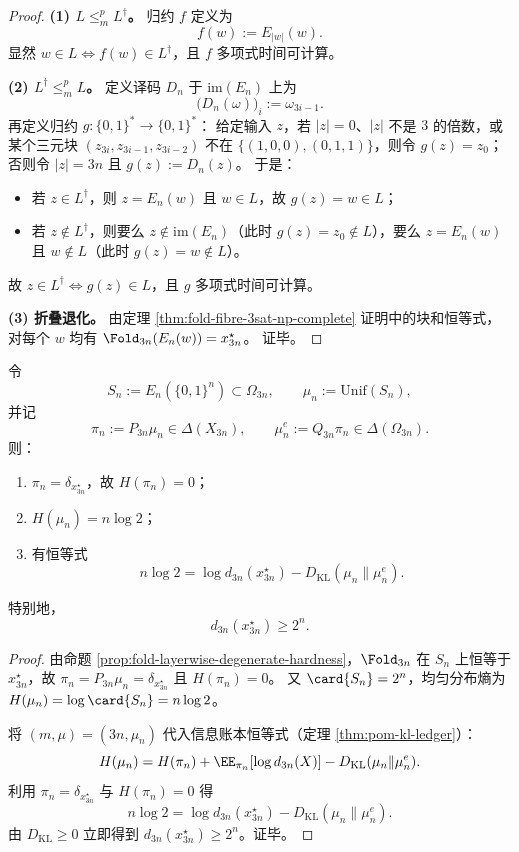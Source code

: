 \begin{proof}
\textbf{(1) \(L\le_m^p L^\dagger\)。}
归约 \(f\) 定义为
\[
f(w):=E_{|w|}(w).
\]
显然 \(w\in L\iff f(w)\in L^\dagger\)，且 \(f\) 多项式时间可计算。
\par
\textbf{(2) \(L^\dagger\le_m^p L\)。}
定义译码 \(D_n\) 于 \(\mathrm{im}(E_n)\) 上为
\[
\bigl(D_n(\omega)\bigr)_i:=\omega_{3i-1}.
\]
再定义归约 \(g:\{0,1\}^\ast\to\{0,1\}^\ast\)：
给定输入 \(z\)，若 \(|z|=0\)、\(|z|\) 不是 \(3\) 的倍数，或某个三元块
\(
(z_{3i},z_{3i-1},z_{3i-2})
\)
不在 \(\{(1,0,0),(0,1,1)\}\)，则令 \(g(z)=z_0\)；
否则令 \(|z|=3n\) 且 \(g(z):=D_n(z)\)。
于是：
\begin{itemize}
  \item 若 \(z\in L^\dagger\)，则 \(z=E_n(w)\) 且 \(w\in L\)，故 \(g(z)=w\in L\)；
  \item 若 \(z\notin L^\dagger\)，则要么 \(z\notin\mathrm{im}(E_n)\)（此时 \(g(z)=z_0\notin L\)），要么 \(z=E_n(w)\) 且 \(w\notin L\)（此时 \(g(z)=w\notin L\)）。
\end{itemize}
故 \(z\in L^\dagger\iff g(z)\in L\)，且 \(g\) 多项式时间可计算。
\par
\textbf{(3) 折叠退化。}
由定理 \ref{thm:fold-fibre-3sat-np-complete} 证明中的块和恒等式，对每个 \(w\) 均有
\(
\Fold_{3n}(E_n(w))=x^\star_{3n}
\)。
证毕。
\end{proof}

\begin{proposition}[宏观熵为零与微观线性熵的账本并存]\label{prop:fold-fiber-ledger-zero-macro-linear-micro}
令
\[
S_n:=E_n(\{0,1\}^n)\subset\Omega_{3n},
\qquad
\mu_n:=\mathrm{Unif}(S_n),
\]
并记
\[
\pi_n:=P_{3n}\mu_n\in\Delta(X_{3n}),
\qquad
\mu_n^e:=Q_{3n}\pi_n\in\Delta(\Omega_{3n}).
\]
则：
\begin{enumerate}
  \item \(\pi_n=\delta_{x^\star_{3n}}\)，故 \(H(\pi_n)=0\)；
  \item \(H(\mu_n)=n\log 2\)；
  \item 有恒等式
  \[
  n\log 2
  =
  \log d_{3n}(x^\star_{3n})
  -
  D_{\mathrm{KL}}(\mu_n\|\mu_n^e).
  \]
\end{enumerate}
特别地，
\[
d_{3n}(x^\star_{3n})\ge 2^n.
\]
\end{proposition}

\begin{proof}
由命题 \ref{prop:fold-layerwise-degenerate-hardness}，\(\Fold_{3n}\) 在 \(S_n\) 上恒等于 \(x^\star_{3n}\)，故
\(
\pi_n=P_{3n}\mu_n=\delta_{x^\star_{3n}}
\)
且 \(H(\pi_n)=0\)。
又 \(\card{S_n}=2^n\)，均匀分布熵为 \(H(\mu_n)=\log\card{S_n}=n\log 2\)。
\par
将 \((m,\mu)=(3n,\mu_n)\) 代入信息账本恒等式（定理 \ref{thm:pom-kl-ledger}）：
\[
H(\mu_n)
=
H(\pi_n)+\EE_{\pi_n}[\log d_{3n}(X)]
-D_{\mathrm{KL}}(\mu_n\|\mu_n^e).
\]
利用 \(\pi_n=\delta_{x^\star_{3n}}\) 与 \(H(\pi_n)=0\) 得
\[
n\log 2
=
\log d_{3n}(x^\star_{3n})
-D_{\mathrm{KL}}(\mu_n\|\mu_n^e).
\]
由 \(D_{\mathrm{KL}}\ge 0\) 立即得到 \(d_{3n}(x^\star_{3n})\ge 2^n\)。证毕。
\end{proof}

